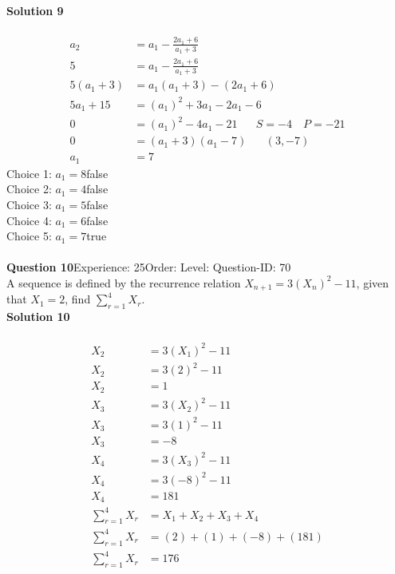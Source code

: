 \documentclass{article}
\begin{document}
\noindent\textbf{Solution 9}\\[2pt]
\\[-35pt]\begin{align*}
a_2&=a_1-\displaystyle\frac{2a_1+6}{a_1+3}\\[2pt]
5&=a_1-\displaystyle\frac{2a_1+6}{a_1+3}\\[2pt]
5(a_1+3)&=a_1(a_1+3)-(2a_1+6)\\[2pt]
5a_1+15&=(a_1)^2+3a_1-2a_1-6\\[2pt]
0&=(a_1)^2-4a_1-21\hspace{20pt}S=-4 \quad P=-21\\[2pt]
0&=(a_1+3)(a_1-7)\hspace{20pt}(3,-7)\\[2pt]
a_1&=7
\end{align*}
Choice 1: \hspace{20pt}$a_1=8$\hspace{20pt}false\\
Choice 2: \hspace{20pt}$a_1=4$\hspace{20pt}false\\
Choice 3: \hspace{20pt}$a_1=5$\hspace{20pt}false\\
Choice 4: \hspace{20pt}$a_1=6$\hspace{20pt}false\\
Choice 5: \hspace{20pt}$a_1=7$\hspace{20pt}true\\
\\[4pt]
\noindent\textbf{Question 10}\hspace{20pt}Experience: 25\hspace{20pt}Order: \hspace{20pt}Level: \hspace{20pt}Question-ID: 70\\[2pt]
A sequence is defined by the recurrence relation $X_{n+1}=3(X_n)^2-11$, given that  $X_1 =2$, find $\displaystyle\sum_{r=1}^{4} X_r$.\\[4pt]
\noindent\textbf{Solution 10}\\[2pt]
\\[-35pt]\begin{align*}
X_2&=3(X_1)^2-11\\[2pt]
X_2&=3(2)^2-11\\[2pt]
X_2&=1\\[12pt]
X_3&=3(X_2)^2-11\\[2pt]
X_3&=3(1)^2-11\\[2pt]
X_3&=-8\\[12pt]
X_4&=3(X_3)^2-11\\[2pt]
X_4&=3(-8)^2-11\\[2pt]
X_4&=181\\[12pt]
\displaystyle\sum_{r=1}^{4} X_r&=X_1+X_2+X_3+X_4\\[2pt]
\displaystyle\sum_{r=1}^{4} X_r&=(2)+(1)+(-8)+(181)\\[2pt]
\displaystyle\sum_{r=1}^{4} X_r&=176
\end{align*}
\end{document}
